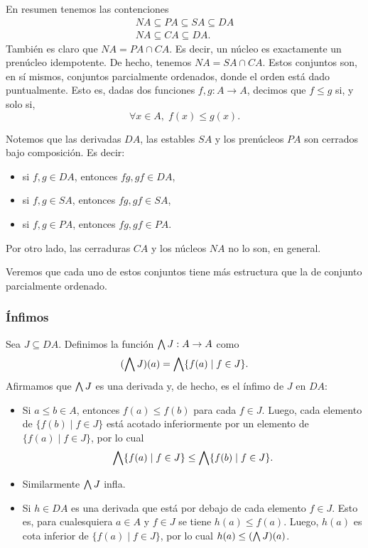En resumen tenemos las contenciones
\begin{align*}
  NA \subseteq PA \subseteq SA \subseteq DA \\
  NA \subseteq CA \subseteq DA.
\end{align*}
También es claro que $NA=PA\cap CA$. Es decir, un núcleo es
exactamente un prenúcleo idempotente.
De hecho, tenemos $NA=SA\cap CA$.
Estos conjuntos son, en sí mismos, conjuntos parcialmente
ordenados, donde el orden está dado puntualmente.
Esto es, dadas dos funciones $f,g:A\to A$, decimos que $f\leq g$
si, y solo si,
\[
  \forall x\in A,\; f(x)\leq g(x)
.\]

Notemos que las derivadas $DA$, las estables $SA$ y los
prenúcleos $PA$ son cerrados bajo composición.
Es decir:
\begin{itemize}
  \item si $f,g\in DA$, entonces $fg,gf\in DA$,
  \item si $f,g\in SA$, entonces $fg,gf\in SA$,
  \item si $f,g\in PA$, entonces $fg,gf\in PA$.
\end{itemize}
Por otro lado, las cerraduras $CA$ y los núcleos $NA$
no lo son, en general.

Veremos que cada uno de estos conjuntos tiene más
estructura que la de conjunto parcialmente ordenado.

\subsubsection{Ínfimos}

Sea $J\subseteq DA$.
Definimos la función $\bigwedge J:A\to A$ como
\[
  (\bigwedge J)(a) = \bigwedge\{f(a) \mid f\in J\}
.\]
Afirmamos que $\bigwedge J$ es una derivada y, de hecho, es el ínfimo
de $J$ en $DA$:
\begin{itemize}
  \item
  Si $a\leq b\in A$, entonces $f(a)\leq f(b)$ para cada $f\in J$.
  Luego, cada elemento de $\{f(b)\mid f\in J\}$ está acotado
  inferiormente por un elemento de $\{f(a)\mid f\in J\}$, por lo
  cual
  \[
    \bigwedge\{f(a)\mid f\in J\} \leq \bigwedge\{f(b)\mid f\in J\}
  .\]
  \item
  Similarmente $\bigwedge J$ infla.
  \item
  Si $h\in DA$ es una derivada que está por debajo de cada
  elemento $f\in J$.
  Esto es, para cualesquiera $a\in A$ y $f\in J$ se tiene
  $h(a)\leq f(a)$.
  Luego, $h(a)$ es cota inferior de $\{f(a) \mid f\in J\}$, por
  lo cual $h(a)\leq (\bigwedge J)(a)$.
\end{itemize}

